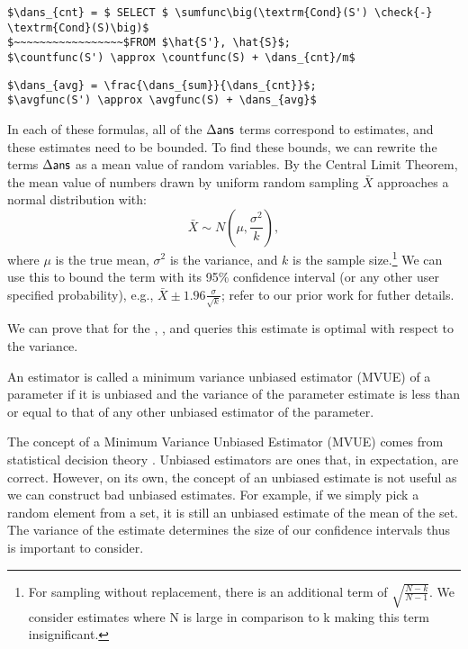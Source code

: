 \begin{lstlisting}[mathescape,basicstyle={\scriptsize}]
$\dans_{cnt} = $ SELECT $ \sumfunc\big(\textrm{Cond}(S') \check{-} \textrm{Cond}(S)\big)$ 
$~~~~~~~~~~~~~~~~~$FROM $\hat{S'}, \hat{S}$;
$\countfunc(S') \approx \countfunc(S) + \dans_{cnt}/m$
\end{lstlisting}


\begin{lstlisting}[mathescape,basicstyle={\scriptsize}]
$\dans_{avg} = \frac{\dans_{sum}}{\dans_{cnt}}$;
$\avgfunc(S') \approx \avgfunc(S) + \dans_{avg}$
\end{lstlisting}

In each of these formulas, all of the $\Delta\textsf{ans}$ terms correspond to estimates, and these estimates need to be bounded.
To find these bounds, we can rewrite the terms $\Delta\textsf{ans}$ as a mean value of random variables.
By the Central Limit Theorem, the mean value of numbers drawn by uniform random sampling $\bar{X}$ approaches a normal distribution with:
\[
\bar{X} \sim N(\mu,\frac{\sigma^2}{k}),
\]
where $\mu$ is the true mean, $\sigma^2$ is the variance, and $k$ is the sample size.\footnote{\scriptsize For sampling without replacement, there is an additional term of $\sqrt{\frac{N-k}{N-1}}$. We consider estimates where N is large in comparison to k making this term insignificant.}
We can use this to bound the term with its 95\% confidence interval (or any other user specified probability), e.g., $\bar{X} \pm 1.96 \frac{\sigma}{\sqrt{k}}$; refer to our prior work \cite{wang1999sample} for futher details.

We can prove that for the \sumfunc, \countfunc, and \avgfunc queries this estimate is optimal with respect to the variance.
\begin{proposition}
An estimator is called a minimum variance unbiased estimator (MVUE) of a parameter if it is unbiased and the variance of the parameter estimate is less than or equal to that of any other unbiased estimator of the parameter.
\end{proposition}
The concept of a Minimum Variance Unbiased Estimator (MVUE) comes from statistical decision theory \cite{cox1979theoretical}.
Unbiased estimators are ones that, in expectation, are correct.
However, on its own, the concept of an unbiased estimate is not useful as we can construct bad unbiased estimates.
For example, if we simply pick a random element from a set, it is still an unbiased estimate of the mean of the set.
The variance of the estimate determines the size of our confidence intervals thus is important to consider.


